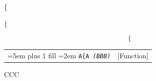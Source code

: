 \documentclass{book}
\newenvironment{Texinfoindented}{\begin{list}{}{}\item\relax}{\end{list}}
\renewcommand{\_}{\Texinfounderscore\discretionary{}{}{}}
\begin{document}
\{

$\{$

\[
\{
\]

%

%

%


\smallbreak
\noindent\begin{tabularx}{\linewidth}{@{}Xr}
\rightskip=5em plus 1 fill \hangindent=2em \hyphenpenalty=10000
\texttt{A\{A \EmbracOn{}\textnormal{\textsl{(BBB)}}\EmbracOff{}}& [Function]
\end{tabularx}

%
\begin{Texinfoindented}
\unskip{\parskip=0pt\noindent}%
CCC
\end{Texinfoindented}
\end{document}
